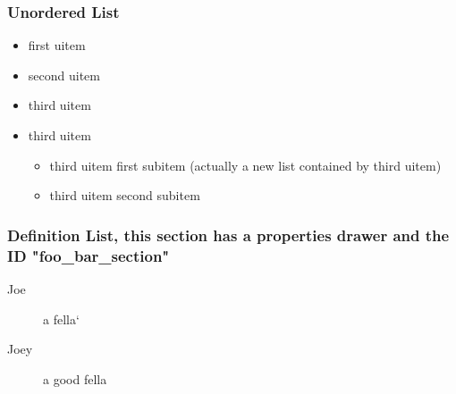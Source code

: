 \documentclass[11pt]{article}
\begin{document}
\subsubsection{Unordered List  }
 \label{obj-108}
 \label{obj-107}
\begin{itemize}
\item
first uitem
\item
second uitem
\item
third uitem
\item
third uitem
\begin{itemize}
\item
third uitem first subitem (actually a new list contained by third uitem)
\item
third uitem second subitem
\end{itemize}
\end{itemize}
\subsubsection{Definition List, this section has a properties drawer and the ID "foo\_bar\_section"  }
 \label{obj-125}
 \label{obj-124}
\begin{description}
\item[Joe]
a fella`
\item[Joey]
a good fella
\end{description}
\end{document}
